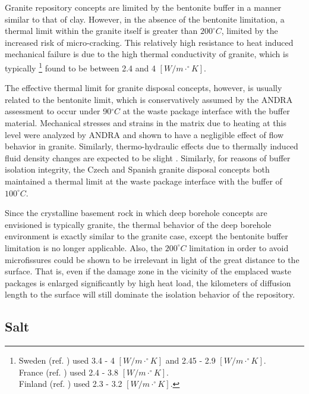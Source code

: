 \documentclass[letterpaper]{article}
\begin{document}
Granite repository concepts are limited by the bentonite buffer in a manner 
similar to that of clay. However, in the absence of the bentonite limitation, a 
thermal limit within the granite itself is greater than $200^{\circ}C$, limited 
by the increased risk of micro-cracking. This relatively high resistance to heat  
induced mechanical failure is due to the high thermal conductivity of granite, 
which is 
typically 
\footnote{
  Sweden (ref. \cite{ab_long-term_2006}) used 3.4 - 4 $[W/m\cdot^{\circ}K]$ and 
  2.45 - 2.9 $[W/m\cdot^{\circ}K]$.\\
  France (ref. \cite{andra_argile:_2005}) used 2.4 - 3.8 
  $[W/m\cdot^{\circ}K]$.\\
  Finland (ref. \cite{posiva_interim_2010}) used 2.3 - 3.2 
  $[W/m\cdot^{\circ}K]$. 
}
found to be between 2.4 and 4 $[W/m\cdot^{\circ}K]$. 

The effective thermal limit for granite disposal concepts, however, is usually 
related to the bentonite limit, which is conservatively assumed by the 
\gls{ANDRA} assessment to occur under 
90$^{\circ}C$ at the waste package interface with the buffer material.  
Mechanical stresses and strains in the matrix due to heating at this 
level were analyzed by \gls{ANDRA} and shown to have a negligible effect of 
flow behavior in granite. Similarly, thermo-hydraulic effects due to thermally
induced fluid density changes are expected to be slight 
\cite{andra_granite:_2005}.
Similarly, for reasons of buffer isolation integrity, the Czech and Spanish
granite disposal concepts both maintained a thermal limit at the waste package
interface with the buffer of $100^{\circ}C$.  \cite{von_lensa_red-impact_2008}

Since the crystalline basement rock in which deep borehole concepts are 
envisioned is typically granite, the thermal behavior of the deep borehole 
environment is exactly similar to the granite case, except the bentonite buffer 
limitation is no longer applicable.  Also, the $200^{\circ}C$ limitation in 
order to avoid microfissures could  be shown to be irrelevant in light of the 
great distance to the surface. That is, even if the damage zone in the vicinity 
of the emplaced waste packages is enlarged significantly by high heat load, 
the kilometers of diffusion length to the surface will still dominate the 
isolation behavior of the repository. 

\subsection{Salt}
\label{subsec:saltthermal}
\end{document}
